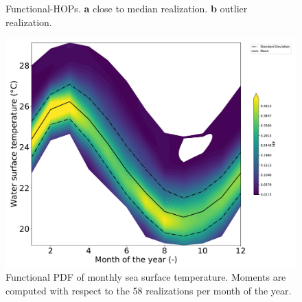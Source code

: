 \begin{figure}[!h]               
\centering
{}
\caption{Functional-HOPs. \textbf{a} close to median realization. \textbf{b} outlier realization.}
\label{fig:f-hops}
\end{figure}

\begin{figure}[!h]
\centering
\includegraphics[width=0.8\linewidth,keepaspectratio]{fig/contributions/visu/pdf.pdf}
\caption{Functional PDF of monthly sea surface temperature. Moments are computed with respect to the 58 realizations per month of the year.}
\label{fig:pdf}
\end{figure}

